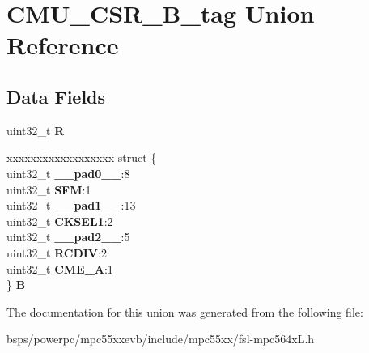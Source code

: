 \hypertarget{unionCMU__CSR__32B__tag}{}\section{C\+M\+U\+\_\+\+C\+S\+R\+\_\+B\+\_\+tag Union Reference}
\label{unionCMU__CSR__32B__tag}
\subsection*{Data Fields}
\begin{DoxyCompactItemize}
\item 
\mbox{\label{unionCMU__CSR__32B__tag_a46a73bc5d9fa3564ff39cdc7541843da}} 
uint32\+\_\+t {\bfseries R}
\item 
\mbox{\label{unionCMU__CSR__32B__tag_ad31c931089015265bea5991309a7b160}} 
\begin{tabbing}
xx\=xx\=xx\=xx\=xx\=xx\=xx\=xx\=xx\=\kill
struct \{\\
\>uint32\_t {\bfseries \_\_pad0\_\_}:8\\
\>uint32\_t {\bfseries SFM}:1\\
\>uint32\_t {\bfseries \_\_pad1\_\_}:13\\
\>uint32\_t {\bfseries CKSEL1}:2\\
\>uint32\_t {\bfseries \_\_pad2\_\_}:5\\
\>uint32\_t {\bfseries RCDIV}:2\\
\>uint32\_t {\bfseries CME\_A}:1\\
\} {\bfseries B}\\

\end{tabbing}\end{DoxyCompactItemize}


The documentation for this union was generated from the following file\+:\begin{DoxyCompactItemize}
\item 
bsps/powerpc/mpc55xxevb/include/mpc55xx/fsl-\/mpc564x\+L.\+h\end{DoxyCompactItemize}
